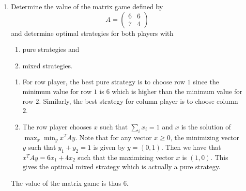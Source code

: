 \documentclass[11pt]{article}
\institute{\'Ecole Polytechnique F\'ed\'erale de Lausanne}
\renewcommand{\geq}{\geqslant}
\begin{document}
\makeheader

\begin{enumerate}[1)]
\item Determine the value of the matrix game defined by 
  \begin{displaymath}
    A =
    \begin{pmatrix}
      6 & 6 \\
      7 & 4
    \end{pmatrix}
  \end{displaymath}
and determine optimal strategies for both players with
\begin{enumerate}
\item pure strategies and 
\item mixed strategies.
\end{enumerate} 


\begin{solution}
\begin{enumerate}
\item For row player, the best pure strategy is to choose row $1$ since the minimum value for row $1$ is $6$ which is higher than the minimum value for row $2$. 
Similarly, the best strategy for column player is to choose column $2$.

\item The row player chooses $x$ such that $\sum_i x_i = 1$ and $x$ is the solution of $\max_x \min_y x^TAy$. Note that for any vector $x \geq 0$, the minimizing vector $y$ such that $y_1 + y_2 = 1$ is given by $y = (0, 1)$. Then we have that $x^TAy = 6x_1 + 4x_2$ such that the maximizing vector $x$ is $(1, 0)$. This gives the optimal mixed strategy which is actually a pure strategy.  
\end{enumerate}
The value of the matrix game is thus 6.
\end{solution}


\end{enumerate}
\end{document}

